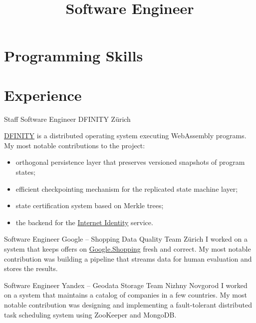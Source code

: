 \documentclass[11pt,a4paper,sans]{moderncv}
\title{Software Engineer}
\newcommand{\Cpp}{C{}\texttt{++}}
\begin{document}
\makecvtitle

\section{Programming Skills}
\cvitem{Proficient}{Rust, \Cpp{}, C}

\section{Experience}

{Staff Software Engineer}
{DFINITY}
{Z\"{u}rich}
{}
{
  \href{https://dfinity.org/}{\textsc{DFINITY}} is a distributed operating system executing WebAssembly programs.
  My most notable contributions to the project:
  \begin{itemize}
      \item orthogonal persistence layer that preserves versioned snapshots of program states;
      \item efficient checkpointing mechanism for the replicated state machine layer;
      \item state certification system based on Merkle trees;
      \item the backend for the \href{https://dfinity.org/howitworks/web-authentication-identity}{Internet Identity} service.
  \end{itemize}
}

{Software Engineer}
{Google -- Shopping Data Quality Team}
{Z\"{u}rich}
{}
{
    I worked on a system that keeps offers on \href{https://shopping.google.com/}{Google.Shopping} fresh and correct.
  My most notable contribution was building a pipeline that streams data for human evaluation and stores the results.
}

{Software Engineer}
{Yandex -- Geodata Storage Team}
{Nizhny Novgorod}
{}
{
  I worked on a system that maintains a catalog of companies in a few countries.
  My most notable contribution was designing and implementing a fault-tolerant distributed task scheduling system using ZooKeeper and MongoDB.
}
\end{document}
